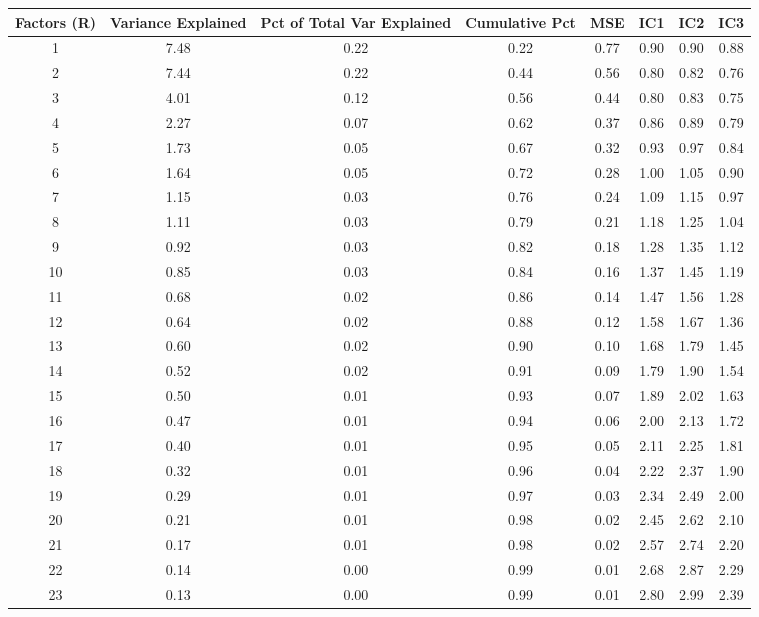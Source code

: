 \documentclass[11pt, letterpaper]{article}\usepackage[]{graphicx}\usepackage[]{color}
\begin{document}
\begin{table}[H]
\centering
\begingroup\scriptsize
\begin{tabular}{cccccccc}
  \hline
Factors (R) & Variance Explained & Pct of Total Var Explained & Cumulative Pct & MSE & IC1 & IC2 & IC3 \\ 
  \hline
  1 & 7.48 & 0.22 & 0.22 & 0.77 & 0.90 & 0.90 & 0.88 \\ 
    2 & 7.44 & 0.22 & 0.44 & 0.56 & 0.80 & 0.82 & 0.76 \\ 
    3 & 4.01 & 0.12 & 0.56 & 0.44 & 0.80 & 0.83 & 0.75 \\ 
    4 & 2.27 & 0.07 & 0.62 & 0.37 & 0.86 & 0.89 & 0.79 \\ 
    5 & 1.73 & 0.05 & 0.67 & 0.32 & 0.93 & 0.97 & 0.84 \\ 
    6 & 1.64 & 0.05 & 0.72 & 0.28 & 1.00 & 1.05 & 0.90 \\ 
    7 & 1.15 & 0.03 & 0.76 & 0.24 & 1.09 & 1.15 & 0.97 \\ 
    8 & 1.11 & 0.03 & 0.79 & 0.21 & 1.18 & 1.25 & 1.04 \\ 
    9 & 0.92 & 0.03 & 0.82 & 0.18 & 1.28 & 1.35 & 1.12 \\ 
   10 & 0.85 & 0.03 & 0.84 & 0.16 & 1.37 & 1.45 & 1.19 \\ 
   11 & 0.68 & 0.02 & 0.86 & 0.14 & 1.47 & 1.56 & 1.28 \\ 
   12 & 0.64 & 0.02 & 0.88 & 0.12 & 1.58 & 1.67 & 1.36 \\ 
   13 & 0.60 & 0.02 & 0.90 & 0.10 & 1.68 & 1.79 & 1.45 \\ 
   14 & 0.52 & 0.02 & 0.91 & 0.09 & 1.79 & 1.90 & 1.54 \\ 
   15 & 0.50 & 0.01 & 0.93 & 0.07 & 1.89 & 2.02 & 1.63 \\ 
   16 & 0.47 & 0.01 & 0.94 & 0.06 & 2.00 & 2.13 & 1.72 \\ 
   17 & 0.40 & 0.01 & 0.95 & 0.05 & 2.11 & 2.25 & 1.81 \\ 
   18 & 0.32 & 0.01 & 0.96 & 0.04 & 2.22 & 2.37 & 1.90 \\ 
   19 & 0.29 & 0.01 & 0.97 & 0.03 & 2.34 & 2.49 & 2.00 \\ 
   20 & 0.21 & 0.01 & 0.98 & 0.02 & 2.45 & 2.62 & 2.10 \\ 
   21 & 0.17 & 0.01 & 0.98 & 0.02 & 2.57 & 2.74 & 2.20 \\ 
   22 & 0.14 & 0.00 & 0.99 & 0.01 & 2.68 & 2.87 & 2.29 \\ 
   23 & 0.13 & 0.00 & 0.99 & 0.01 & 2.80 & 2.99 & 2.39 \\ 

\end{tabular}
\end{table}
\end{document}
